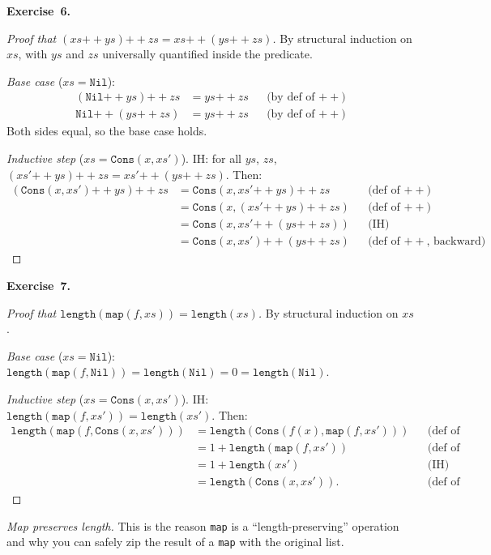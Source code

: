 \documentclass[11pt]{article}
\begin{document}
\medskip
\textbf{Exercise~6.}
\begin{proof}[Proof that $(xs \mathbin{++} ys) \mathbin{++} zs = xs \mathbin{++} (ys \mathbin{++} zs)$]
By structural induction on $xs$, with $ys$ and $zs$ universally quantified inside the predicate.

\emph{Base case} ($xs = \texttt{Nil}$):
\begin{align*}
  (\texttt{Nil} \mathbin{++} ys) \mathbin{++} zs &= ys \mathbin{++} zs && \text{(by def of $\mathbin{++}$)} \\
  \texttt{Nil} \mathbin{++} (ys \mathbin{++} zs) &= ys \mathbin{++} zs && \text{(by def of $\mathbin{++}$)}
\end{align*}
Both sides equal, so the base case holds.

\emph{Inductive step} ($xs = \texttt{Cons}(x, xs')$). IH: for all $ys$, $zs$, $(xs' \mathbin{++} ys) \mathbin{++} zs = xs' \mathbin{++} (ys \mathbin{++} zs)$. Then:
\begin{align*}
  (\texttt{Cons}(x, xs') \mathbin{++} ys) \mathbin{++} zs
    &= \texttt{Cons}(x, xs' \mathbin{++} ys) \mathbin{++} zs && \text{(def of $\mathbin{++}$)} \\
    &= \texttt{Cons}(x, (xs' \mathbin{++} ys) \mathbin{++} zs) && \text{(def of $\mathbin{++}$)} \\
    &= \texttt{Cons}(x, xs' \mathbin{++} (ys \mathbin{++} zs)) && \text{(IH)} \\
    &= \texttt{Cons}(x, xs') \mathbin{++} (ys \mathbin{++} zs) && \text{(def of $\mathbin{++}$, backward)}
\end{align*}
\checkmark
\end{proof}

\medskip
\textbf{Exercise~7.}
\begin{proof}[Proof that $\texttt{length}(\texttt{map}(f, xs)) = \texttt{length}(xs)$]
By structural induction on $xs$.

\emph{Base case} ($xs = \texttt{Nil}$): $\texttt{length}(\texttt{map}(f, \texttt{Nil})) = \texttt{length}(\texttt{Nil}) = 0 = \texttt{length}(\texttt{Nil})$. \checkmark

\emph{Inductive step} ($xs = \texttt{Cons}(x, xs')$). IH: $\texttt{length}(\texttt{map}(f, xs')) = \texttt{length}(xs')$. Then:
\begin{align*}
  \texttt{length}(\texttt{map}(f, \texttt{Cons}(x, xs')))
    &= \texttt{length}(\texttt{Cons}(f(x), \texttt{map}(f, xs'))) && \text{(def of map)} \\
    &= 1 + \texttt{length}(\texttt{map}(f, xs')) && \text{(def of length)} \\
    &= 1 + \texttt{length}(xs') && \text{(IH)} \\
    &= \texttt{length}(\texttt{Cons}(x, xs')). && \text{(def of length, backward)}
\end{align*}
\checkmark
\end{proof}
\emph{Map preserves length.} This is the reason \texttt{map} is a ``length-preserving'' operation and why you can safely zip the result of a \texttt{map} with the original list.
\end{document}
